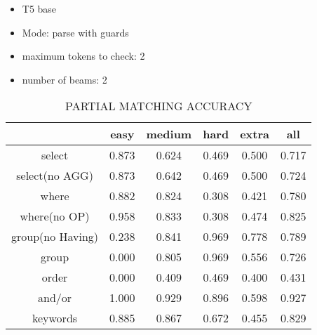 \begin{itemize}
    \item T5 base
    \item Mode: parse with guards
    \item maximum tokens to check: 2
    \item number of beams: 2
\end{itemize}

\begin{table}[h!]
    \centering
    \begin{tabular}{|c|c|c|c|c|c|}
        \hline
                         & easy  & medium & hard  & extra & all   \\ \hline
        select           & 0.873 & 0.624  & 0.469 & 0.500 & 0.717 \\ \hline
        select(no AGG)   & 0.873 & 0.642  & 0.469 & 0.500 & 0.724 \\ \hline
        where            & 0.882 & 0.824  & 0.308 & 0.421 & 0.780 \\ \hline
        where(no OP)     & 0.958 & 0.833  & 0.308 & 0.474 & 0.825 \\ \hline
        group(no Having) & 0.238 & 0.841  & 0.969 & 0.778 & 0.789 \\ \hline
        group            & 0.000 & 0.805  & 0.969 & 0.556 & 0.726 \\ \hline
        order            & 0.000 & 0.409  & 0.469 & 0.400 & 0.431 \\ \hline
        and/or           & 1.000 & 0.929  & 0.896 & 0.598 & 0.927 \\ \hline

        keywords         & 0.885 & 0.867  & 0.672 & 0.455 & 0.829 \\ \hline
    \end{tabular}
    \caption{PARTIAL MATCHING ACCURACY}
\end{table}

